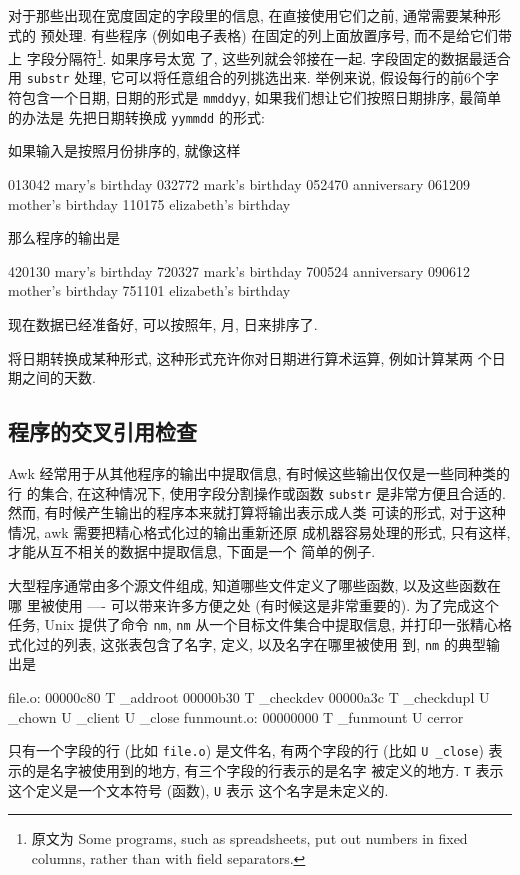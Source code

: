 对于那些出现在宽度固定的字段里的信息, 在直接使用它们之前, 通常需要某种形式的
预处理. 有些程序 (例如电子表格) 在固定的列上面放置序号, 而不是给它们带上
字段分隔符\footnote{原文为 Some programs, such as spreadsheets, put out
numbers in fixed columns, rather than with field separators.}. 如果序号太宽
了, 这些列就会邻接在一起. 字段固定的数据最适合用 \verb'substr' 处理,
它可以将任意组合的列挑选出来. 举例来说, 假设每行的前6个字符包含一个日期, 
日期的形式是 \verb'mmddyy', 如果我们想让它们按照日期排序, 最简单的办法是
先把日期转换成 \verb'yymmdd' 的形式:
如果输入是按照月份排序的, 就像这样
\begin{shell}
    013042 mary's birthday
    032772 mark's birthday
    052470 anniversary
    061209 mother's birthday
    110175 elizabeth's birthday
\end{shell}
那么程序的输出是
\begin{shell}
    420130 mary's birthday
    720327 mark's birthday
    700524 anniversary
    090612 mother's birthday
    751101 elizabeth's birthday
\end{shell}
现在数据已经准备好, 可以按照年, 月, 日来排序了.

\begin{exercise}
    将日期转换成某种形式, 这种形式充许你对日期进行算术运算, 例如计算某两
    个日期之间的天数.
\end{exercise}

\subsection{程序的交叉引用检查}
\label{subsec:program_cross_reference_checking}

Awk 经常用于从其他程序的输出中提取信息, 有时候这些输出仅仅是一些同种类的行
的集合, 在这种情况下, 使用字段分割操作或函数 \verb'substr'
是非常方便且合适的. 然而, 有时候产生输出的程序本来就打算将输出表示成人类
可读的形式, 对于这种情况, awk 需要把精心格式化过的输出重新还原
成机器容易处理的形式, 只有这样, 才能从互不相关的数据中提取信息, 下面是一个
简单的例子.

大型程序通常由多个源文件组成, 知道哪些文件定义了哪些函数, 以及这些函数在哪
里被使用 ---- 可以带来许多方便之处 (有时候这是非常重要的). 为了完成这个
任务, Unix 提供了命令 \verb'nm', \verb'nm' 从一个目标文件集合中提取信息,
并打印一张精心格式化过的列表, 这张表包含了名字, 定义, 以及名字在哪里被使用
到, \verb'nm' 的典型输出是
\begin{shell}
    file.o:
    00000c80 T _addroot
    00000b30 T _checkdev
    00000a3c T _checkdupl
             U _chown
             U _client
             U _close
    funmount.o:
    00000000 T _funmount
             U cerror
\end{shell}
只有一个字段的行 (比如 \verb'file.o') 是文件名, 有两个字段的行 (比如 
\verb'U _close') 表示的是名字被使用到的地方, 有三个字段的行表示的是名字
被定义的地方. \verb'T' 表示这个定义是一个文本符号 (函数), \verb'U' 表示 
这个名字是未定义的.

